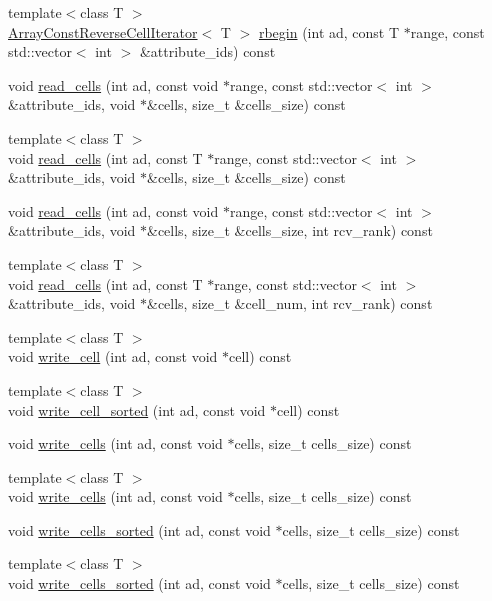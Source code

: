 \begin{DoxyCompactItemize}
\item 
{\footnotesize template$<$class T $>$ }\\\hyperlink{classArrayConstReverseCellIterator}{Array\+Const\+Reverse\+Cell\+Iterator}$<$ T $>$ \hyperlink{classStorageManager_a2396f9d78a636d95255abd26f9616fa9}{rbegin} (int ad, const T $\ast$range, const std\+::vector$<$ int $>$ \&attribute\+\_\+ids) const 
\item 
void \hyperlink{classStorageManager_acc3da6e2e682cf3f796ab359801758b2}{read\+\_\+cells} (int ad, const void $\ast$range, const std\+::vector$<$ int $>$ \&attribute\+\_\+ids, void $\ast$\&cells, size\+\_\+t \&cells\+\_\+size) const 
\item 
{\footnotesize template$<$class T $>$ }\\void \hyperlink{classStorageManager_aa28e02f51d6ae440348474662699cdaa}{read\+\_\+cells} (int ad, const T $\ast$range, const std\+::vector$<$ int $>$ \&attribute\+\_\+ids, void $\ast$\&cells, size\+\_\+t \&cells\+\_\+size) const 
\item 
void \hyperlink{classStorageManager_a39e39288e7a40b6d6c9ab095fdbac48d}{read\+\_\+cells} (int ad, const void $\ast$range, const std\+::vector$<$ int $>$ \&attribute\+\_\+ids, void $\ast$\&cells, size\+\_\+t \&cells\+\_\+size, int rcv\+\_\+rank) const 
\item 
{\footnotesize template$<$class T $>$ }\\void \hyperlink{classStorageManager_a7d1ca5278f9e094319537dce4db6a494}{read\+\_\+cells} (int ad, const T $\ast$range, const std\+::vector$<$ int $>$ \&attribute\+\_\+ids, void $\ast$\&cells, size\+\_\+t \&cell\+\_\+num, int rcv\+\_\+rank) const 
\item 
{\footnotesize template$<$class T $>$ }\\void \hyperlink{classStorageManager_a9c40375b8672c978611a7056714b67df}{write\+\_\+cell} (int ad, const void $\ast$cell) const 
\item 
{\footnotesize template$<$class T $>$ }\\void \hyperlink{classStorageManager_a92a8332dfdf89b8268c4b9327fc81392}{write\+\_\+cell\+\_\+sorted} (int ad, const void $\ast$cell) const 
\item 
void \hyperlink{classStorageManager_af0758bf4fea21e0909d409d04c4f8123}{write\+\_\+cells} (int ad, const void $\ast$cells, size\+\_\+t cells\+\_\+size) const 
\item 
{\footnotesize template$<$class T $>$ }\\void \hyperlink{classStorageManager_adb958e2bbe6cc306e308d8c10aa1fba9}{write\+\_\+cells} (int ad, const void $\ast$cells, size\+\_\+t cells\+\_\+size) const 
\item 
void \hyperlink{classStorageManager_a0c96ed26b380e0907af6fe59a92be672}{write\+\_\+cells\+\_\+sorted} (int ad, const void $\ast$cells, size\+\_\+t cells\+\_\+size) const 
\item 
{\footnotesize template$<$class T $>$ }\\void \hyperlink{classStorageManager_adfe89e9ee8f8ac605003dd873fcc2725}{write\+\_\+cells\+\_\+sorted} (int ad, const void $\ast$cells, size\+\_\+t cells\+\_\+size) const 
\end{DoxyCompactItemize}
